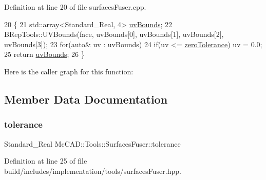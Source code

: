 Definition at line 20 of file surfaces\+Fuser.\+cpp.


\begin{DoxyCode}
20                                                               \{
21     std::array<Standard\_Real, 4> \hyperlink{classMcCAD_1_1Tools_1_1SurfacesFuser_a5525c22611c4982eeded8b867928e2db}{uvBounds};
22     BRepTools::UVBounds(face, uvBounds[0], uvBounds[1], uvBounds[2], uvBounds[3]);
23     \textcolor{keywordflow}{for}(\textcolor{keyword}{auto}& uv : uvBounds)
24         \textcolor{keywordflow}{if}(uv <= \hyperlink{classMcCAD_1_1Tools_1_1SurfacesFuser_a7ff8c39d261160d8c0e81be599ce9835}{zeroTolerance}) uv = 0.0;
25     \textcolor{keywordflow}{return} \hyperlink{classMcCAD_1_1Tools_1_1SurfacesFuser_a5525c22611c4982eeded8b867928e2db}{uvBounds};
26 \}
\end{DoxyCode}
Here is the caller graph for this function\+:


\subsection{Member Data Documentation}
\mbox{\label{classMcCAD_1_1Tools_1_1SurfacesFuser_ad93b6c71e01c6b0692203d1671b7e8a4}} 
\subsubsection{\texorpdfstring{tolerance}{tolerance}}
{\footnotesize\ttfamily Standard\+\_\+\+Real Mc\+C\+A\+D\+::\+Tools\+::\+Surfaces\+Fuser\+::tolerance\hspace{0.3cm}{\ttfamily [private]}}



Definition at line 25 of file build/includes/implementation/tools/surfaces\+Fuser.\+hpp.

\mbox{\label{classMcCAD_1_1Tools_1_1SurfacesFuser_a7ff8c39d261160d8c0e81be599ce9835}} 
